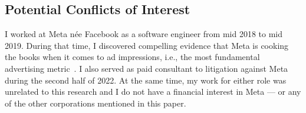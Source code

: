 \subsection{Potential Conflicts of Interest}

I worked at Meta n\'ee Facebook as a software engineer from mid 2018 to mid
2019. During that time, I discovered compelling evidence that Meta is cooking
the books when it comes to ad impressions, i.e., the most fundamental
advertising metric~. I also served as paid
consultant to litigation against Meta during the second half of 2022. At the
same time, my work for either role was unrelated to this research and I do not
have a financial interest in Meta --- or any of the other corporations mentioned
in this paper.
